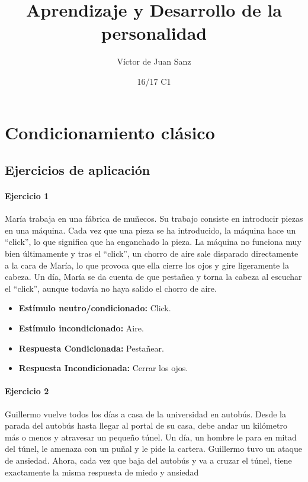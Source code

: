 \documentclass[palatino,nochap]{apuntesURJC}
\title{Aprendizaje y Desarrollo de la personalidad}
\author{Víctor de Juan Sanz}
\date{16/17 C1}
\begin{document}
\pagestyle{plain}
\maketitle

\tableofcontents
\newpage


\section{Condicionamiento clásico}

\subsection{Ejercicios de aplicación}

\paragraph{Ejercicio 1}
María trabaja en una fábrica de muñecos. Su trabajo consiste en introducir piezas en
una máquina. Cada vez que una pieza se ha introducido, la máquina hace un “click”,
lo que significa que ha enganchado la pieza. La máquina no funciona muy bien
últimamente y tras el “click”, un chorro de aire sale disparado directamente a la cara
de María, lo que provoca que ella cierre los ojos y gire ligeramente la cabeza.
Un día, María se da cuenta de que pestañea y torna la cabeza al escuchar el “click”,
aunque todavía no haya salido el chorro de aire.

\begin{itemize}
\item \textbf{Estímulo neutro/condicionado:} Click.
\item \textbf{Estímulo incondicionado:} Aire.
\item \textbf{Respuesta Condicionada:} Pestañear.
\item \textbf{Respuesta Incondicionada:} Cerrar los ojos.
\end{itemize}

\paragraph{Ejercicio 2}

Guillermo vuelve todos los días a casa de la universidad en autobús. Desde la
parada del autobús hasta llegar al portal de su casa, debe andar un kilómetro más o
menos y atravesar un pequeño túnel. Un día, un hombre le para en mitad del túnel,
le amenaza con un puñal y le pide la cartera. Guillermo tuvo un ataque de ansiedad.
Ahora, cada vez que baja del autobús y va a cruzar el túnel, tiene exactamente la
misma respuesta de miedo y ansiedad
\end{document}
